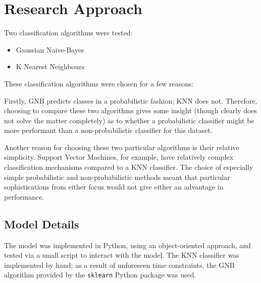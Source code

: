 \documentclass{tufte-handout}
\begin{document}
\newpage
\section{Research Approach}
Two classification algorithms were tested:
\begin{itemize}
    \item Gaussian Naive-Bayes
    \item K Nearest Neighbours
\end{itemize}

These classification algorithms were chosen for a few reasons:\par

\bigskip

Firstly, GNB predicts classes in a probabilistic fashion; KNN does not. Therefore, choosing to compare these two algorithms gives some insight (though clearly does not solve the matter completely) as to whether a probabilistic classifier might be more performant than a non-probabilistic classifier for this dataset. \par

Another reason for choosing these two particular algorithms is their relative simplicity. Support Vector Machines, for example, have relatively complex classification mechanisms compared to a KNN classifier. The choice of especially simple probabilistic and non-probabilistic methods meant that particular sophistications from either focus would not give either an advantage in performance.\par

\subsection{Model Details}
The model was implemented in Python, using an object-oriented approach, and tested via a small script to interact with the model. The KNN classifier was implemented by hand; as a result of unforeseen time constraints, the GNB algorithm provided by the \texttt{sklearn} Python package was used.\par
\end{document}
